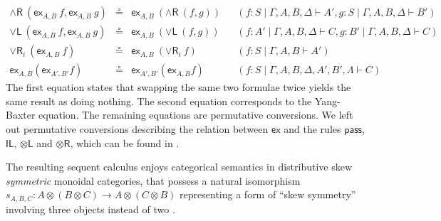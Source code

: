 \documentclass[submission,copyright,creativecommons]{eptcs}
\theoremstyle{definition}
\newcommand{\tl}{\otimes \mathsf{L}}
\newcommand{\tr}{\otimes \mathsf{R}}
\newcommand{\pass}{\mathsf{pass}}
\newcommand{\unitl}{\mathsf{IL}}
\newcommand{\andltwo}{\land \mathsf{L}_{2}}
\newcommand{\andr}{\land \mathsf{R}}
\newcommand{\orl}{\lor \mathsf{L}}
\newcommand{\orrone}{\lor \mathsf{R}_{1}}
\newcommand{\orrtwo}{\lor \mathsf{R}_{2}}
\newcommand{\orri}{\lor \mathsf{R}_{i}}
\newcommand{\ot}{\otimes}
\newcommand{\ex}{\mathsf{ex}}
\begin{document}
\begin{equation*}
\begin{array}{rclll}
  \\
  \andr \ (\ex_{A , B} \ f , \ex_{A , B} \ g) &\circeq &\ex_{A , B} \ (\andr \ (f , g)) &&(f : S \mid \Gamma , A , B , \Delta \vdash A' , g : S \mid \Gamma , A , B , \Delta \vdash B')
  \\
  \orl \ (\ex_{A , B} \ f , \ex_{A , B} \ g) &\circeq &\ex_{A , B} \ (\orl \ (f , g)) &&(f : A' \mid \Gamma , A , B , \Delta \vdash C ,  g : B' \mid \Gamma , A , B , \Delta \vdash C)
  \\
  \orri \ (\ex_{A , B} \ f) &\circeq &\ex_{A , B} \ (\orri \ f) &&(f : S \mid \Gamma , A , B \vdash A')
  \\
  \ex_{A , B}  (\ex_{A' , B'}  f) &\circeq & \ex_{A' , B'}  (\ex_{A , B}  f) &&(f: S \mid \Gamma , A , B , \Delta , A' , B' , \Lambda \vdash C)
\end{array}
\end{equation*}
The first equation states that swapping the same two formulae twice yields the same result as doing nothing.
The second equation corresponds to the Yang-Baxter equation.
The remaining equations are permutative conversions.
We left out permutative conversions describing the relation between $\ex$ and the rules $\pass$, $\unitl$, $\tl$ and $\tr$, which can be found in \cite[Fig. 2]{veltri:coherence:2021}.

The resulting sequent calculus enjoys categorical semantics in distributive skew \emph{symmetric} monoidal categories, that possess a natural isomorphism $s_{A , B , C} : A \ot (B \ot C) \to A \ot (C \ot B)$ representing a form of ``skew symmetry''  involving three objects instead of two \cite{bourke:lack:braided:2020}.
\end{document}

